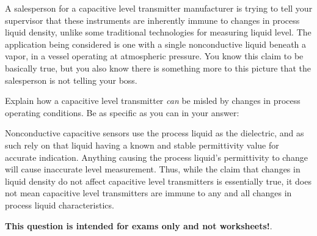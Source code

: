 

A salesperson for a capacitive level transmitter manufacturer is trying to tell your supervisor that these instruments are inherently immune to changes in process liquid density, unlike some traditional technologies for measuring liquid level.  The application being considered is one with a single nonconductive liquid beneath a vapor, in a vessel operating at atmospheric pressure.  You know this claim to be basically true, but you also know there is something more to this picture that the salesperson is not telling your boss.

\vskip 10pt

Explain how a capacitive level transmitter {\it can} be misled by changes in process operating conditions.  Be as specific as you can in your answer:

\vskip 50pt







Nonconductive capacitive sensors use the process liquid as the dielectric, and as such rely on that liquid having a known and stable permittivity value for accurate indication.  Anything causing the process liquid's permittivity to change will cause inaccurate level measurement.  Thus, while the claim that changes in liquid density do not affect capacitive level transmitters is essentially true, it does not mean capacitive level transmitters are immune to any and all changes in process liquid characteristics.







{\bf This question is intended for exams only and not worksheets!}.


